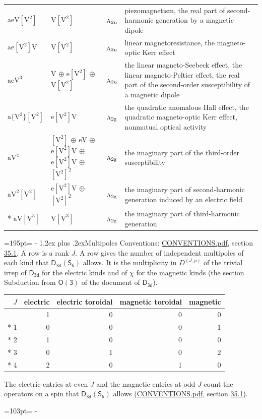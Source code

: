 \documentclass[10pt,a4paper]{article}
\makeatletter
\renewcommand\section{\@startsection{section}{1}{\z@}{-3ex plus -1ex minus -.2ex}%
  {1.2ex plus .2ex}{\normalfont\large\sffamily\bfseries\color{parttitle}}}
\newcommand{\needspace}[1]{\par\penalty-100\begingroup\dimen0=#1\relax\dimen2=\pagegoal
  \advance\dimen2-\pagetotal\ifdim\dimen0>\dimen2\relax\ifdim\dimen2>0pt\vfil\break\fi\fi
  \endgroup}
\numberwithin{equation}{section}
\newcommand{\grp}[1]{\mathsf{#1}}
\newcommand{\irr}[1]{\text{\normalfont\scshape #1}}
\newcommand{\ptag}[1]{\mathrm{#1}}
\newcommand{\irrJp}[2]{D^{(#1,#2)}}
\newcommand{\jahn}[1]{\mathrm{#1}}
\newlength{\fillwidth}\newlength{\cellwidth}\newlength{\colwidth}
\makeatother
\begin{document}
{\begin{longtable}{@{}lll>{\RaggedRight\arraybackslash}p{\fillwidth}@{}}
$\jahn{aeV[V^{2}]}$ & $\jahn{V[V^{2}]}$ & $\irr{a}_{2\ptag{u}}$ & piezomagnetism, the real part of second-harmonic generation by a magnetic dipole\\
$\jahn{ae[V^{2}]V}$ & $\jahn{V[V^{2}]}$ & $\irr{a}_{2\ptag{u}}$ & linear magnetoresistance, the magneto-optic Kerr effect\\
$\jahn{aeV^{3}}$ & $\jahn{V}$ $\oplus$ $\jahn{e[V^{2}]}$ $\oplus$ $\jahn{V[V^{2}]}$ & $\irr{a}_{2\ptag{u}}$ & the linear magneto-Seebeck effect, the linear magneto-Peltier effect, the real part of the second-order susceptibility of a magnetic dipole\\
$\jahn{a\{V^{2}\}[V^{2}]}$ & $\jahn{e[V^{2}]V}$ & $\irr{a}_{2\ptag{g}}$ & the quadratic anomalous Hall effect, the quadratic magneto-optic Kerr effect, nonmutual optical activity\\
$\jahn{aV^{4}}$ & $\jahn{[V^{2}]}$ $\oplus$ $\jahn{eV}$ $\oplus$ $\jahn{e[V^{2}]V}$ $\oplus$ $\jahn{e[V^{2}]V}$ $\oplus$ $\jahn{[V^{2}]^{2}}$ & $\irr{a}_{2\ptag{g}}$ & the imaginary part of the third-order susceptibility\\
$\jahn{aV^{2}[V^{2}]}$ & $\jahn{e[V^{2}]V}$ $\oplus$ $\jahn{[V^{2}]^{2}}$ & $\irr{a}_{2\ptag{g}}$ & the imaginary part of second-harmonic generation induced by an electric field\\*
$\jahn{aV[V^{3}]}$ & $\jahn{V[V^{3}]}$ & $\irr{a}_{2\ptag{g}}$ & the imaginary part of third-harmonic generation\\
\bottomrule\end{longtable}}
\needspace{195pt}
\section{Multipoles}\label{s:multipoles}
Conventions: \href{../../CONVENTIONS.pdf}{CONVENTIONS.pdf}, section \href{../../CONVENTIONS.pdf\#conv.35.1}{35.1}.
A row is a rank $J$. \label{n:head.multipole.electric}\label{n:head.multipole.electric.toroidal}\label{n:head.multipole.magnetic.toroidal}\label{n:head.multipole.magnetic}A row gives the number of independent multipoles of each kind that $\grp{D_{3d}}(\grp{S_{6}})$ allows. It is the multiplicity in $\irrJp{J}{p}$ of the trivial irrep of $\grp{D_{3d}}$ for the electric kinds and of $\chi$ for the magnetic kinds (the section Subduction from $\grp{O(3)}$ of the document of \href{../../../rotation/data/pdf/D3d.pdf}{$\grp{D_{3d}}$}).
{\small\begin{longtable}{@{}rrrrr@{}}\toprule
$J$ & electric & electric toroidal & magnetic toroidal & magnetic\\\midrule\endhead
\bottomrule\endfoot\endlastfoot
0 & 1 & 0 & 0 & 0\\*
1 & 0 & 0 & 0 & 1\\*
2 & 1 & 0 & 0 & 0\\*
3 & 0 & 1 & 0 & 2\\*
4 & 2 & 0 & 1 & 0\\
\bottomrule\end{longtable}}
The electric entries at even $J$ and the magnetic entries at odd $J$ count the operators on a spin that $\grp{D_{3d}}(\grp{S_{6}})$ allows (\href{../../CONVENTIONS.pdf}{CONVENTIONS.pdf}, section \href{../../CONVENTIONS.pdf\#conv.35.1}{35.1}).
\needspace{103pt}
\end{document}
